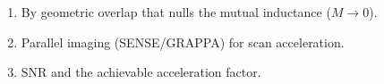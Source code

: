 \begin{enumerate}[leftmargin=1.6em,itemsep=2pt]
\item By geometric overlap that nulls the mutual inductance ($M \to 0$).
\item Parallel imaging (SENSE/GRAPPA) for scan acceleration.
\item SNR and the achievable acceleration factor.
\end{enumerate}
